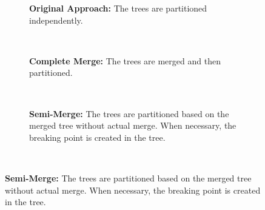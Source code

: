 \documentclass[border=10pt]{article}
\begin{document}
\begin{figure}
  \centering
  \begin{subfigure}[b]{0.9\textwidth}
      
      
    \caption{\textbf{Original Approach:} The trees are partitioned independently.}
  \end{subfigure} ~ %

  \begin{subfigure}[b]{0.9\textwidth}
      
      
    \caption{\textbf{Complete Merge:} The trees are merged and then partitioned.}
  \end{subfigure} ~ %

  \begin{subfigure}[b]{0.9\textwidth}
      
      
      \caption{\textbf{Semi-Merge:} The trees are partitioned based on the merged tree without actual merge. When necessary, the breaking point is created in the tree.}
  \end{subfigure} ~ %
  \label{fig:oa}
\end{figure}
\end{document}
